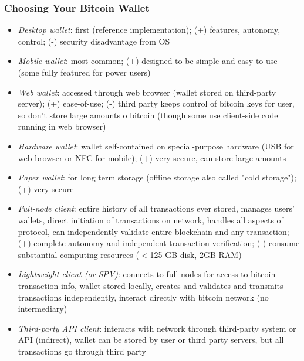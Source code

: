 \documentclass[english, 11pt]{article}
\begin{document}
\subsubsection{Choosing Your Bitcoin Wallet}
\begin{itemize}
    \item \textit{Desktop wallet}: first (reference implementation); (+) features, autonomy, control; (-) security disadvantage from OS
    \item \textit{Mobile wallet}: most common; (+) designed to be simple and easy to use (some fully featured for power users)
    \item \textit{Web wallet}: accessed through web browser (wallet stored on third-party server); (+) ease-of-use; (-) third party keeps control of bitcoin keys for user, so don't store large amounts o bitcoin (though some use client-side code running in web browser)
    \item \textit{Hardware wallet}: wallet self-contained on special-purpose hardware (USB for web browser or NFC for mobile); (+) very secure, can store large amounts
    \item \textit{Paper wallet}: for long term storage (offline storage also called "cold storage"); (+) very secure
    \item \textit{Full-node client}: entire history of all transactions ever stored, manages users' wallets, direct initiation of transactions on network, handles all aspects of protocol, can independently validate entire blockchain and any transaction; (+) complete autonomy and independent transaction verification; (-) consume substantial computing resources ($<$125 GB disk, 2GB RAM)
    \item \textit{Lightweight client (or SPV)}: connects to full nodes for access to bitcoin transaction info, wallet stored locally, creates and validates and transmits transactions independently, interact directly with bitcoin network (no intermediary)
    \item \textit{Third-party API client}: interacts with network through third-party system or API (indirect), wallet can be stored by user or third party servers, but all transactions go through third party
\end{itemize}
\end{document}
